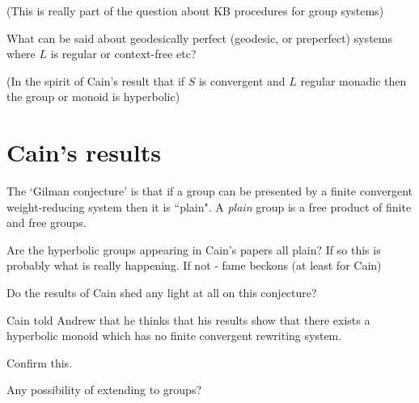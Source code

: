 \documentclass[a4paper]{article}
\begin{document}
(This is really part of the question about KB procedures for group systems)



What can be said about geodesically perfect (geodesic, or preperfect) systems where $L$ is regular or context-free etc?

(In the spirit of Cain's result that if $S$ is convergent and $L$ regular monadic then the group or monoid is hyperbolic)



\section{Cain's results}

The `Gilman conjecture' is that if a group can be presented by a finite convergent weight-reducing system then it is ``plain". A {\it plain} group is a free product of finite and free groups.

Are the hyperbolic groups appearing in Cain's papers all plain? If so this is probably what is really happening. If not  -  fame beckons (at least for Cain)



Do the results of Cain shed any light at all on this conjecture?



Cain told Andrew that he thinks that his results show that there exists a hyperbolic monoid which has no finite convergent rewriting system.

Confirm this.

Any possibility of extending to groups?
\end{document}
